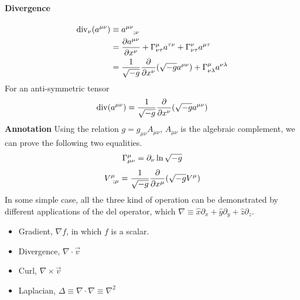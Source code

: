\documentclass[letterpaper,10pt,english]{sphinxmanual}
\begin{document}
\paragraph{Divergence}
\label{math:divergence}\begin{gather}
\begin{split}\mathrm{div}_\nu(a^{\mu\nu})&\equiv   a^{\mu\nu}_{\phantom{\mu\nu};\nu} \\
& = \frac{\partial a^{\mu\nu}}{\partial x^\nu}+\Gamma^\mu_{\nu\tau}a^{\tau\nu}+\Gamma^\nu_{\nu\tau}a^{\mu\tau} \\
& = \frac1{\sqrt{-g}}\frac{\partial}{\partial x^\nu}(\sqrt{-g}a^{\mu\nu})+\Gamma^\mu_{\nu\lambda}a^{\nu\lambda}\end{split}\notag
\end{gather}
For an anti-symmetric tensor
\begin{gather}
\begin{split}\mathrm {div}(a^{\mu\nu})=\frac1{\sqrt{-g}}\frac{\partial}{\partial x^\nu}(\sqrt{-g}a^{\mu\nu})\end{split}\notag
\end{gather}
\textbf{Annotation} Using the relation \(g=g_{\mu\nu}A_{\mu\nu}\), \(A_{\mu\nu}\) is the algebraic complement, we can prove the following two equalities.
\begin{gather}
\begin{split}\Gamma^\mu_{\mu\nu}=\partial_\nu\ln{\sqrt{-g}}\end{split}\notag
\end{gather}\begin{gather}
\begin{split}V^\mu_{\phantom\mu;\mu}=\frac1{\sqrt{-g}}\frac{\partial}{\partial x^\mu}(\sqrt{-g}V^\mu)\end{split}\notag
\end{gather}
In some simple case, all the three kind of operation can be demonstrated by different applications of the del operator, which \(\nabla\equiv \hat x\partial_x+\hat y\partial_y+\hat z \partial_z\).
\begin{itemize}
\item {} 
Gradient,  \(\nabla f\), in which \(f\) is a scalar.

\item {} 
Divergence, \(\nabla\cdot \vec v\)

\item {} 
Curl, \(\nabla \times \vec v\)

\item {} 
Laplacian, \(\Delta\equiv \nabla\cdot\nabla\equiv \nabla^2\)

\end{itemize}
\end{document}
